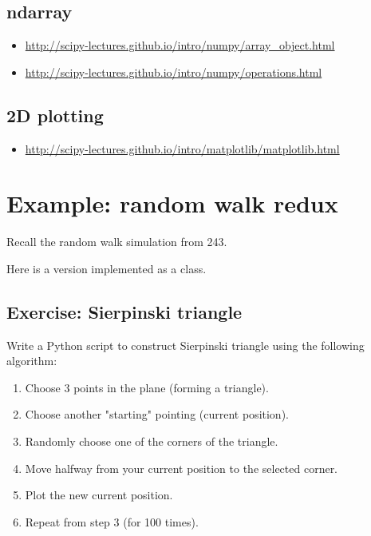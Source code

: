 \subsection{ndarray}

\begin{itemize}
\item \url{http://scipy-lectures.github.io/intro/numpy/array_object.html}
\item \url{http://scipy-lectures.github.io/intro/numpy/operations.html}
\end{itemize}

\subsection{2D plotting}

\begin{itemize}
\item \url{http://scipy-lectures.github.io/intro/matplotlib/matplotlib.html}
\end{itemize}

\section{Example: random walk redux}

Recall the random walk simulation from 243.


Here is a version implemented as a class.


\subsection{Exercise: Sierpinski triangle}
Write a Python script to construct Sierpinski triangle using the following
algorithm:

\begin{enumerate}
\item Choose 3 points in the plane (forming a triangle).
\item Choose another "starting" pointing (current position).
\item Randomly choose one of the corners of the triangle.
\item Move halfway from your current position to the selected corner.
\item Plot the new current position.
\item Repeat from step 3 (for 100 times).
\end{enumerate}

